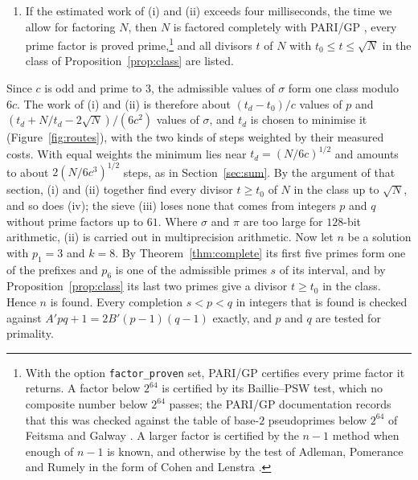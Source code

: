 \documentclass[11pt,reqno]{amsart}
\numberwithin{equation}{section}
\theoremstyle{plain}
\theoremstyle{definition}
\theoremstyle{remark}
\begin{document}
\begin{enumerate}[label=\textup{(\roman*)}, leftmargin=*]
  particular every value that comes from primes.
\item If the estimated work of (i) and (ii) exceeds four milliseconds,
  the time we allow for factoring $N$, then $N$ is factored completely with
  PARI/GP \cite{PARI}, every prime factor is proved
  prime,\footnote{With the option \texttt{factor\_proven} set, PARI/GP
  certifies every prime factor it returns. A factor below $2^{64}$ is
  certified by its Baillie--PSW test, which no composite number below
  $2^{64}$ passes; the PARI/GP documentation records that this was
  checked against the table of base-$2$ pseudoprimes below $2^{64}$ of
  Feitsma and Galway \cite{FG}. A larger factor is certified by the
  $n-1$ method \cite{BLS75} when enough of $n-1$ is known, and
  otherwise by the test of Adleman, Pomerance and Rumely
  \cite{APR83} in the form of Cohen and Lenstra \cite{CL84}.} and all
  divisors $t$ of $N$ with $t_0\le t\le\sqrt N$ in the class of
  Proposition~\ref{prop:class} are listed.
\end{enumerate}
Since $c$ is odd and prime to $3$, the admissible values of $\sigma$
form one class modulo $6c$. The work of (i) and (ii) is therefore about
$(t_d-t_0)/c$ values of $p$ and $(t_d+N/t_d-2\sqrt N)/(6c^2)$ values of
$\sigma$, and $t_d$ is chosen to minimise it (Figure~\ref{fig:routes}),
with the two kinds of steps weighted by their measured costs. With equal weights the minimum
lies near $t_d=(N/6c)^{1/2}$ and amounts to about $2(N/6c^3)^{1/2}$
steps, as in Section~\ref{sec:sum}. By the argument of that section,
(i) and (ii) together find every divisor $t\ge t_0$ of $N$ in the class
up to $\sqrt N$, and so does (iv); the sieve (iii) loses none that
comes from integers $p$ and $q$ without prime factors up to $61$. Where
$\sigma$ and $\pi$ are too large for $128$-bit arithmetic, (ii) is
carried out in multiprecision arithmetic. Now let $n$ be a solution with
$p_1=3$ and $k=8$. By Theorem~\ref{thm:complete} its first five primes
form one of the prefixes and $p_6$ is one of the admissible primes $s$
of its interval, and by Proposition~\ref{prop:class} its last two
primes give a divisor $t\ge t_0$ in the class. Hence $n$ is found.
Every completion $s<p<q$ in integers that is found is checked against
$A'pq+1=2B'(p-1)(q-1)$ exactly, and $p$ and $q$ are tested for
primality.
\end{document}
